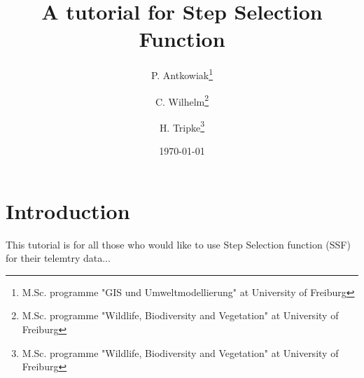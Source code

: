 \documentclass[11pt, a4paper]{article}\usepackage[]{graphicx}\usepackage[]{color}
\begin{document}



\title{A tutorial for Step Selection Function}

\author{P. Antkowiak\thanks{M.Sc. programme "GIS und Umweltmodellierung" at University of Freiburg} \and C. Wilhelm\thanks{M.Sc. programme "Wildlife, Biodiversity and Vegetation" at University of Freiburg} \and H. Tripke\thanks{M.Sc. programme "Wildlife, Biodiversity and Vegetation" at University of Freiburg}}

\date{\today} %

\maketitle


\tableofcontents


\section{Introduction}%
This tutorial is for all those who would like to use Step Selection function (SSF) for their telemtry data...
\end{document}
